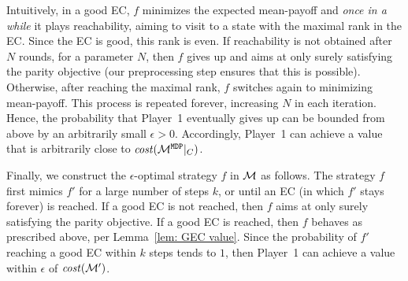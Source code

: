 \documentclass[runningheads,a4paper]{llncs}
\newcommand{\M}{{\cal M}}
\newcommand{\MDP}{{\mathtt{MDP}}}
\newcommand{\cost}{{\it cost}}
\begin{document}
Intuitively, in a good EC, $f$ minimizes the expected mean-payoff and \emph{once in a while} it plays reachability, aiming to visit to a state with the maximal rank in the EC. Since the EC is good, this rank is even.
If reachability is not obtained after $N$ rounds, for a parameter $N$, then $f$ gives up and aims at only surely satisfying the parity objective (our preprocessing step ensures that this is possible).
Otherwise, after reaching the maximal rank, $f$ switches again to minimizing mean-payoff.
This process is repeated forever, increasing $N$ in each iteration.
Hence, the probability that Player~1 eventually gives up can be bounded from above by an arbitrarily small $\epsilon > 0$. Accordingly, Player~1 can achieve a value that is arbitrarily close to $\cost(\M^\MDP|_C)$.

Finally, we construct the $\epsilon$-optimal strategy $f$ in $\M$ as follows. 
The strategy $f$ first mimics $f'$ for a large number of steps $k$, or until an EC (in which $f'$ stays forever) is reached.
If a good EC is not reached, then $f$ aims at only surely satisfying the parity objective. If a good EC is reached, then $f$ behaves as prescribed above, per Lemma~\ref{lem: GEC value}. Since the probability of $f'$ reaching a good EC within $k$ steps tends to $1$, then Player~1 can achieve a value within $\epsilon$ of $\cost(\M')$.
\end{document}
